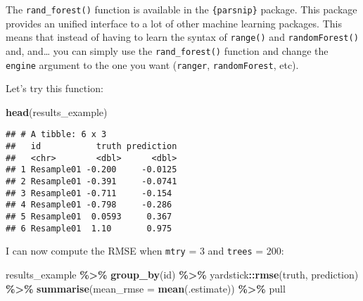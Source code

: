 \documentclass[
]{article}
\newenvironment{Shaded}{\begin{snugshade}}{\end{snugshade}}
\newcommand{\DataTypeTok}[1]{\textcolor[rgb]{0.13,0.29,0.53}{#1}}
\newcommand{\DecValTok}[1]{\textcolor[rgb]{0.00,0.00,0.81}{#1}}
\newcommand{\KeywordTok}[1]{\textcolor[rgb]{0.13,0.29,0.53}{\textbf{#1}}}
\newcommand{\NormalTok}[1]{#1}
\newcommand{\OperatorTok}[1]{\textcolor[rgb]{0.81,0.36,0.00}{\textbf{#1}}}
\newcommand{\StringTok}[1]{\textcolor[rgb]{0.31,0.60,0.02}{#1}}
\begin{document}
The \texttt{rand\_forest()} function is available in the \texttt{\{parsnip\}} package. This package provides an
unified interface to a lot of other machine learning packages. This means that instead of having to
learn the syntax of \texttt{range()} and \texttt{randomForest()} and, and\ldots{} you can simply use the \texttt{rand\_forest()}
function and change the \texttt{engine} argument to the one you want (\texttt{ranger}, \texttt{randomForest}, etc).

Let's try this function:

\begin{Shaded}
\end{Shaded}

\begin{Shaded}
\begin{Highlighting}[]
\KeywordTok{head}\NormalTok{(results\_example)}
\end{Highlighting}
\end{Shaded}

\begin{verbatim}
## # A tibble: 6 x 3
##   id           truth prediction
##   <chr>        <dbl>      <dbl>
## 1 Resample01 -0.200     -0.0125
## 2 Resample01 -0.391     -0.0741
## 3 Resample01 -0.711     -0.154 
## 4 Resample01 -0.798     -0.286 
## 5 Resample01  0.0593     0.367 
## 6 Resample01  1.10       0.975
\end{verbatim}

I can now compute the RMSE when \texttt{mtry} = 3 and \texttt{trees} = 200:

\begin{Shaded}
\begin{Highlighting}[]
\NormalTok{results\_example }\OperatorTok{\%\textgreater{}\%}
\StringTok{    }\KeywordTok{group\_by}\NormalTok{(id) }\OperatorTok{\%\textgreater{}\%}
\StringTok{    }\NormalTok{yardstick}\OperatorTok{::}\KeywordTok{rmse}\NormalTok{(truth, prediction) }\OperatorTok{\%\textgreater{}\%}
\StringTok{    }\KeywordTok{summarise}\NormalTok{(}\DataTypeTok{mean\_rmse =} \KeywordTok{mean}\NormalTok{(.estimate)) }\OperatorTok{\%\textgreater{}\%}
\StringTok{    }\NormalTok{pull}
\end{Highlighting}
\end{Shaded}
\end{document}
